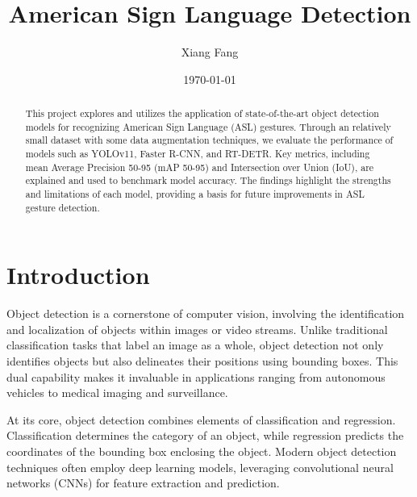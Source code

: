 \documentclass[a4paper]{article}
\title{\textbf{American Sign Language Detection}}
\author{Xiang Fang}
\date{\today}
\begin{document}
\maketitle

\begin{abstract}
This project explores and utilizes the application of state-of-the-art object detection models for recognizing American Sign Language (ASL) gestures. 
Through an relatively small dataset with some data augmentation techniques, we evaluate the performance of models such as YOLOv11, Faster R-CNN, and RT-DETR. Key metrics, 
including mean Average Precision 50-95 (mAP 50-95) and Intersection over Union (IoU), are explained and used to benchmark model accuracy. The findings highlight the strengths and limitations of each model, 
providing a basis for future improvements in ASL gesture detection.
\end{abstract}

\tableofcontents
\newpage

\section{Introduction}

Object detection is a cornerstone of computer vision, involving the identification and localization of objects within images or video streams. Unlike traditional classification tasks that label an image as a whole, 
object detection not only identifies objects but also delineates their positions using bounding boxes. This dual capability makes it invaluable in applications ranging from autonomous vehicles to medical imaging and surveillance.

At its core, object detection combines elements of classification and regression. Classification determines the category of an object, while regression predicts the coordinates of the bounding box enclosing the object. 
Modern object detection techniques often employ deep learning models, leveraging convolutional neural networks (CNNs) for feature extraction and prediction.
\end{document}

